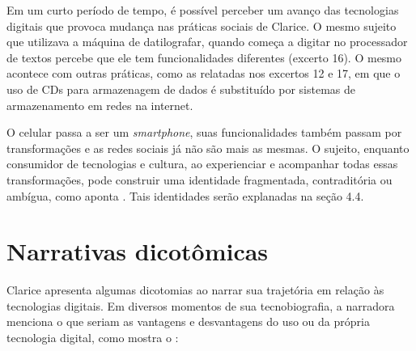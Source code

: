 \documentclass{textolivre}
\begin{document}
Em um curto período de tempo, é possível perceber um avanço das tecnologias digitais que provoca mudança nas práticas sociais de Clarice. O mesmo sujeito que utilizava a máquina de datilografar, quando começa a digitar no processador de textos percebe que ele tem funcionalidades diferentes (excerto 16). O mesmo acontece com outras práticas, como as relatadas nos excertos 12 e 17, em que o uso de CDs para armazenagem de dados é substituído por sistemas de armazenamento em redes na internet. 

O celular passa a ser um \textit{smartphone}, suas funcionalidades também passam por transformações e as redes sociais já não são mais as mesmas. O sujeito, enquanto consumidor de tecnologias e cultura, ao experienciar e acompanhar todas essas transformações, pode construir uma identidade fragmentada, contraditória ou ambígua, como aponta \textcite{moita2002}. Tais identidades serão explanadas na seção 4.4.

\section{Narrativas dicotômicas}\label{sec-dicotomicas}
Clarice apresenta algumas dicotomias ao narrar sua trajetória em relação às tecnologias digitais. Em diversos momentos de sua tecnobiografia, a narradora menciona o que seriam as vantagens e desvantagens do uso ou da própria tecnologia digital, como mostra o :
\end{document}
